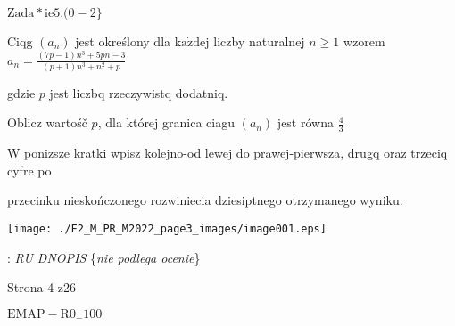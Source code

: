 \documentclass[a4paper,12pt]{article}
\begin{document}
$\mathrm{Z}\mathrm{a}\mathrm{d}\mathrm{a}*\mathrm{i}\mathrm{e}5. (0-2\}$

Ciqg $(a_{n})$ jest określony dla $\mathrm{k}\mathrm{a}\dot{\mathrm{z}}\mathrm{d}\mathrm{e}\mathrm{j}$ liczby naturalnej $n\geq 1$ wzorem $a_{n}=\displaystyle \frac{(7p-1)n^{3}+5pn-3}{(p+1)n^{3}+n^{2}+p}$

gdzie $p$ jest liczbq rzeczywistq dodatniq.

Oblicz wartośč $p$, dla której granica ciagu $(a_{n})$ jest równa $\displaystyle \frac{4}{3}$

W ponizsze kratki wpisz kolejno-od lewej do prawej-pierwsza, drugq oraz trzeciq cyfre po

przecinku nieskończonego rozwiniecia dziesiptnego otrzymanego wyniku.
\begin{center}
\texttt{[image: ./F2\_M\_PR\_M2022\_page3\_images/image001.eps]}
\end{center}
: {\it RU DNOPIS} \{{\it nie podlega ocenie}\}

Strona 4 z26

$\mathrm{E}\mathrm{M}\mathrm{A}\mathrm{P}-\mathrm{R}0_{-}100$
\end{document}
